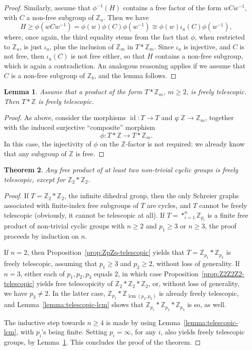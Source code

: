 \documentclass[10pt,a4paper]{amsart}
\newtheorem{theo}{Theorem}[section]
\newtheorem{lemm}[theo]{Lemma}
\theoremstyle{definition}
\newcommand{\ZZ}{\mathbb{Z}}
\DeclareMathOperator{\lcm}{lcm}
\DeclareMathOperator{\id}{id}
\begin{document}
\begin{proof}
Similarly, assume that ${\phi}^{-1}(H)$ contains a free factor of the form $wCw^{-1}$, with $C$ a non-free subgroup of $\ZZ_a$.
Then we have
\[
H \geq \phi(wCw^{-1}) = \phi(w)\phi(C)\phi(w^{-1}) \cong \phi(w){\iota}_a(C)\phi(w^{-1}),
\]
where, once again, the third equality stems from the fact that ${\phi}$, when restricted to $\ZZ_a$, is just ${\iota}_a$, plus the inclusion of $\ZZ_m$ in $T*\ZZ_m$. Since ${\iota}_a$ is injective, and $C$ is not free, then ${\iota}_a(C)$ is not free either, so that $H$ contains a non-free subgroup, which is again a contradiction. An analogous reasoning applies if we assume that $C$ is a non-free subgroup of $\ZZ_b$, and the lemma follows.
\end{proof}

\begin{lemm}\label{lemma:telescopic-Z}
Assume that a product of the form $T*\ZZ_m$, $m\geq 2$, is freely telescopic. Then $T*\ZZ$ is freely telescopic.
\end{lemm}
\begin{proof}
As above, consider the morphisms $\id : T\to T$ and $q: \ZZ\to \ZZ_m$, together with the induced surjective ``composite'' morphism
\[
{\phi}: T*\ZZ \to T*\ZZ_m. 
\]
In this case, the injectivity of ${\phi}$ on the $\ZZ$-factor is not required: we already know that any subgroup of $\ZZ$ is free.
\end{proof}


\begin{theo}\label{thm:free-products-are-telescopic}
Any free product of at least two non-trivial cyclic groups is freely telescopic, except for $\ZZ_2*\ZZ_2$.
\end{theo}

\begin{proof}
If $T = \ZZ_2*\ZZ_2$, the infinite dihedral group, then the only Schreier graphs associated with finite-index free subgroups of $T$ are cycles, and $T$ cannot be freely telescopic (obviously, it cannot be telescopic at all). If $T = \ast^{n}_{i=1} \ZZ_{p_i}$ is a finite free product of non-trivial cyclic groups with $n \geq 2$ and $p_1 \geq 3$ or $n \geq 3$, the proof proceeds by induction on $n$. 

If $n=2$, then Proposition~\ref{prop:ZpZq-telescopic} yields that $T = \ZZ_{p_{1}}*\ZZ_{p_{2}}$ is freely telescopic, assuming that $p_{1} \geq 3$ and $p_{2} \geq 2$, without loss of generality. If $n=3$, either each of $p_{1},p_{2},p_{3}$ equals $2$, in which case Proposition~\ref{prop:Z2Z2Z2-telescopic} yields free telescopicity of $\ZZ_{2}*\ZZ_{2}*\ZZ_{2}$, or, without loss of generality, we have $p_{3}\neq2$. In the latter case, $\ZZ_{p_{1}}*\ZZ_{\lcm(p_{2},p_{3})}$ is already freely telescopic, and Lemma~\ref{lemma:telescopic-lcm} shows that $\ZZ_{p_{1}}*\ZZ_{p_{2}}*\ZZ_{p_{3}}$ is so, as well.
 
The inductive step towards $n \geq 4$ is made by using Lemma~\ref{lemma:telescopic-lcm}, with $p_i$'s being finite. Setting $p_i=\infty$, for any $i$, also yields freely telescopic groups, by Lemma~\ref{lemma:telescopic-Z}. This concludes the proof of the theorem.
\end{proof}
\end{document}
